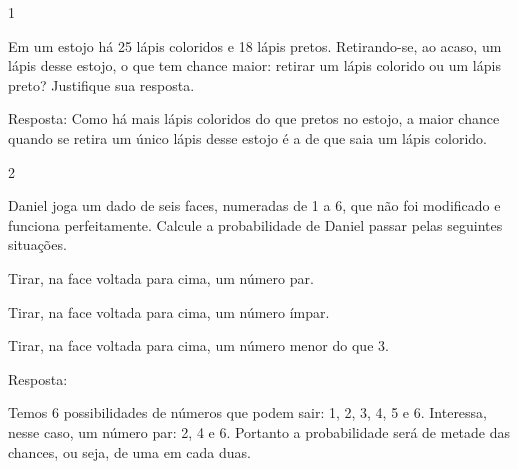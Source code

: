 \begin{escolha}
{\begin{escolha}

\num{1}

Em um estojo há 25 lápis coloridos e 18 lápis pretos. Retirando-se, ao
acaso, um lápis desse estojo, o que tem chance maior: retirar um lápis
colorido ou um lápis preto? Justifique sua resposta.


Resposta:
Como há mais lápis coloridos do que pretos no estojo, a maior chance
quando se retira um único lápis desse estojo é a de que saia um lápis
colorido.


\num{2}

Daniel joga um dado de seis faces, numeradas de 1 a 6, que não foi modificado e funciona perfeitamente. Calcule a probabilidade de Daniel passar pelas seguintes situações.

\begin{escolha}

\item
  Tirar, na face voltada para cima, um número par.
\end{escolha}


\begin{escolha}

\item
  Tirar, na face voltada para cima, um número ímpar.
\end{escolha}


\begin{escolha}

\item
  Tirar, na face voltada para cima, um número menor do que 3.
\end{escolha}


Resposta:

\begin{escolha}

\item
  Temos 6 possibilidades de números que podem sair: 1, 2, 3, 4, 5 e 6.
  Interessa, nesse caso, um número par: 2, 4 e 6. Portanto a probabilidade será de metade das chances, ou seja, de uma em cada duas.
\end{escolha}


\end{escolha}}
\end{escolha}
